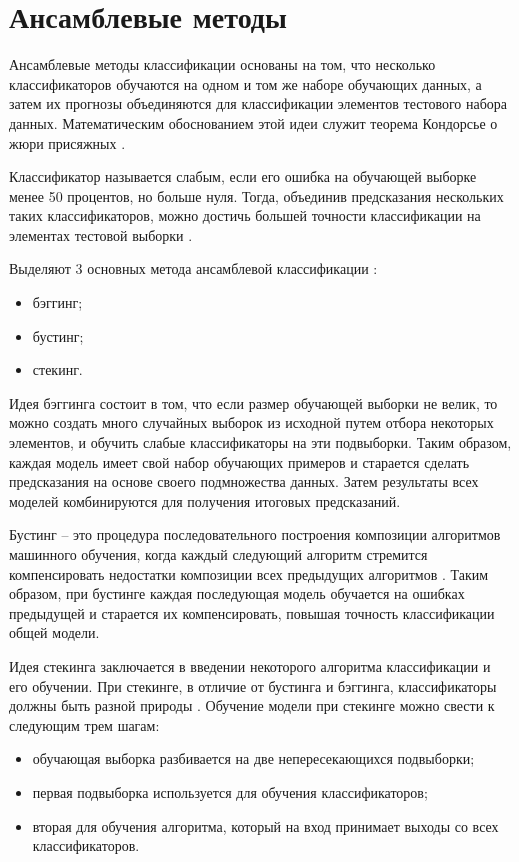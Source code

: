 \section{Ансамблевые методы}
Ансамблевые методы классификации основаны на том, что несколько классификаторов обучаются на одном и том же наборе обучающих данных, а затем их прогнозы объединяются для классификации элементов тестового набора данных. Математическим обоснованием этой идеи служит теорема Кондорсье о жюри присяжных \cite{ansambles}.

Классификатор называется слабым, если его ошибка на обучающей выборке менее 50 процентов, но больше нуля. Тогда, объединив предсказания нескольких таких классификаторов, можно достичь большей точности классификации на элементах тестовой выборки \cite{ansambles}.

Выделяют 3 основных метода ансамблевой классификации \cite{ansambles}:
\begin{itemize}
	\item бэггинг;
	\item бустинг;
	\item стекинг.
\end{itemize}

Идея бэггинга состоит в том, что если размер обучающей выборки не велик, то можно создать много случайных выборок из исходной путем отбора некоторых элементов, и обучить слабые классификаторы на эти подвыборки. Таким образом, каждая модель имеет свой набор обучающих примеров и старается сделать предсказания на основе своего подмножества данных. Затем результаты всех моделей комбинируются для получения итоговых предсказаний.

Бустинг -- это процедура последовательного построения композиции алгоритмов машинного обучения, когда каждый следующий алгоритм стремится компенсировать недостатки композиции всех предыдущих алгоритмов \cite{ansambles}. Таким образом, при бустинге каждая последующая модель обучается на ошибках предыдущей и старается их компенсировать, повышая точность классификации общей модели.

Идея стекинга заключается в введении некоторого алгоритма классификации и его обучении. При стекинге, в отличие от бустинга и бэггинга, классификаторы должны быть разной природы \cite{ansambles}. Обучение модели при стекинге можно свести к следующим трем шагам:
\begin{itemize}
	\item обучающая выборка разбивается на две непересекающихся подвыборки;
	\item первая подвыборка используется для обучения классификаторов;
	\item вторая для обучения алгоритма, который на вход принимает выходы со всех классификаторов.
\end{itemize}

